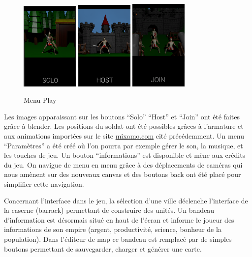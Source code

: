 \documentclass[12pt]{report}
\begin{document}
\begin{figure}[H]
    \centering
    \includegraphics[width=0.25\textwidth]{SoloIcon}
    \includegraphics[width=0.25\textwidth]{HostIcon}
    \includegraphics[width=0.25\textwidth]{JoinIcon}
    \caption{Menu Play}
\end{figure}

Les images apparaissant sur les boutons “Solo” “Host” et “Join” ont été faites
grâce à blender. Les positions du soldat ont été possibles grâces à l’armature
et aux animations importées sur le site \url{mixamo.com} cité précédemment. Un
menu “Paramètres” a été créé où l’on pourra par exemple gérer le son, la
musique, et les touches de jeu. Un bouton “informations” est disponible et mène
aux crédits du jeu. On navigue de menu en menu grâce à des déplacements de
caméras qui nous amènent sur des nouveaux canvas et des boutons back ont été
placé pour simplifier cette navigation.

Concernant l'interface dans le jeu, la sélection d'une ville déclenche
l'interface de la caserne (barrack) permettant de construire des unités. Un
bandeau d'information est désormais situé en haut de l'écran et informe le
joueur des informations de son empire (argent, productivité, science, bonheur
de la population). Dans l'éditeur de map ce bandeau est remplacé par de simples
boutons permettant de sauvegarder, charger et générer une carte.
\end{document}
